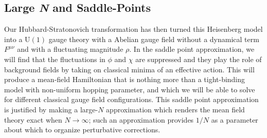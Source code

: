 \documentclass{report}
\begin{document}
\subsection{Large \textit{N} and Saddle-Points}
Our Hubbard-Stratonovich transformation has then turned this Heisenberg model
into a $ \text{U}(1) $ gauge theory with a Abelian gauge field without a
dynamical term $ F^{\mu\nu} $ and with a fluctuating magnitude $ \rho $. In the
saddle point approximation, we will find that the fluctuations in $ \phi $ and $
\chi $ are suppressed and they play the role of background fields by taking on
classical minima of an effective action. This will produce a mean-field
Hamiltonian that is nothing more than a tight-binding model with non-uniform
hopping parameter, and which we will be able to solve for different classical
gauge field configurations. This saddle point approximation is justified by
making a large-$N$ approximation which renders the mean field theory exact when
$ N \rightarrow \infty $; such an approximation provides $ 1/N $ as a parameter 
about which to organize perturbative corrections. 
\end{document}
